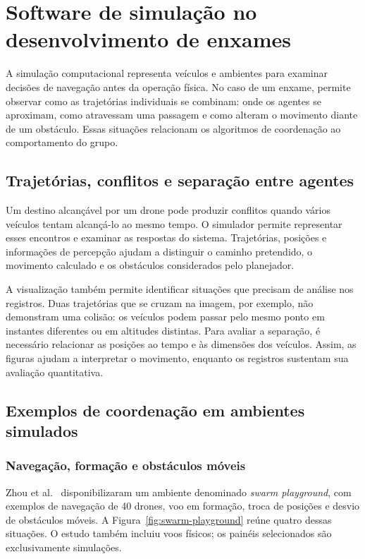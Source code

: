 \chapter[Software de simulação]{Software de simulação no desenvolvimento de enxames}\label{cap:sim}
A simulação computacional representa veículos e ambientes para examinar decisões de navegação antes da operação física. No caso de um enxame, permite observar como as trajetórias individuais se combinam: onde os agentes se aproximam, como atravessam uma passagem e como alteram o movimento diante de um obstáculo. Essas situações relacionam os algoritmos de coordenação ao comportamento do grupo.

\section{Trajetórias, conflitos e separação entre agentes}
Um destino alcançável por um drone pode produzir conflitos quando vários veículos tentam alcançá-lo ao mesmo tempo. O simulador permite representar esses encontros e examinar as respostas do sistema. Trajetórias, posições e informações de percepção ajudam a distinguir o caminho pretendido, o movimento calculado e os obstáculos considerados pelo planejador.

A visualização também permite identificar situações que precisam de análise nos registros. Duas trajetórias que se cruzam na imagem, por exemplo, não demonstram uma colisão: os veículos podem passar pelo mesmo ponto em instantes diferentes ou em altitudes distintas. Para avaliar a separação, é necessário relacionar as posições ao tempo e às dimensões dos veículos. Assim, as figuras ajudam a interpretar o movimento, enquanto os registros sustentam sua avaliação quantitativa.

\section{Exemplos de coordenação em ambientes simulados}
\subsection{Navegação, formação e obstáculos móveis}
Zhou et al.~\cite{wildpaper} disponibilizaram um ambiente denominado \emph{swarm playground}, com exemplos de navegação de 40 drones, voo em formação, troca de posições e desvio de obstáculos móveis. A Figura~\ref{fig:swarm-playground} reúne quatro dessas situações. O estudo também incluiu voos físicos; os painéis selecionados são exclusivamente simulações.

